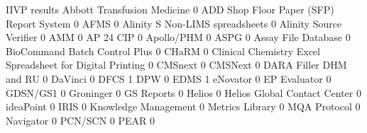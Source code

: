 \documentclass{article}
\begin{document}
\begin{Schunk}
\begin{Soutput}
                                                            IIVP results
  Abbott Transfusion Medicine                                          0
  ADD Shop Floor Paper (SFP) Report System                             0
  AFMS                                                                 0
  Alinity S Non-LIMS spreadsheets                                      0
  Alinity Source Verifier                                              0
  AMM                                                                  0
  AP 24 CIP                                                            0
  Apollo/PHM                                                           0
  ASPG                                                                 0
  Assay File Database                                                  0
  BioCommand Batch Control Plus                                        0
  CHaRM                                                                0
  Clinical Chemistry Excel Spreadsheet for Digital Printing            0
  CMSnext                                                              0
  CMSNext                                                              0
  DARA Filler DHM and RU                                               0
  DaVinci                                                              0
  DFCS                                                                 1
  DPW                                                                  0
  EDMS                                                                 1
  eNovator                                                             0
  EP Evaluator                                                         0
  GDSN/GS1                                                             0
  Groninger                                                            0
  GS Reports                                                           0
  Helios                                                               0
  Helios Global Contact Center                                         0
  ideaPoint                                                            0
  IRIS                                                                 0
  Knowledge Management                                                 0
  Metrics Library                                                      0
  MQA Protocol                                                         0
  Navigator                                                            0
  PCN/SCN                                                              0
  PEAR                                                                 0

\end{Soutput}
\end{Schunk}
\end{document}
